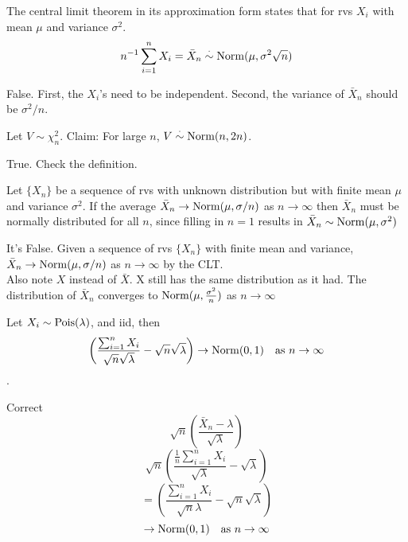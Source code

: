 \documentclass[tf-tutorial-all.tex]{subfiles}
\begin{document}
\begin{truefalse}
  The central limit theorem in its approximation form states that for
  rvs $X_i$ with mean $\mu$ and variance $\sigma^2$.
  $$ n^{-1}\sum_{i=1}^n X_i = \bar X_n \stackrel{\cdot}\sim \mathrm{Norm}(\mu, \sigma^2 \sqrt{n}) $$
\begin{solution}
False. First, the $X_i$'s need to be independent. Second, the variance of $\bar X_{n}$ should  be $\sigma^2/n$.
\end{solution}
\end{truefalse}

\begin{truefalse}
  Let $V \sim \chi^2_n$. Claim: For large $n$, $V \stackrel{\cdot}\sim \mathrm{Norm}(n, 2n)$.
\begin{solution}
True. Check the definition.
\end{solution}
\end{truefalse}

\begin{truefalse}
Let $\{X_{n}\}$ be a sequence of rvs with unknown distribution but with finite mean $\mu $ and variance $\sigma^{2}$.
If the average $\bar{X}_{n} \to \mathrm{Norm}(\mu, \sigma/n)$ as $n \to \infty$ then $\bar X_{n}$ must be normally distributed for all $n$, since filling in $ n=1 $ results in $\bar{X}_{n} \sim \mathrm{Norm}(\mu, \sigma^{2})$
\begin{solution}
It's False. Given a sequence of rvs $\{X_{n}\}$ with finite mean and variance,  $\bar{X}_{n} \to \mathrm{Norm}(\mu, \sigma/n)$ as $n \to \infty$ by the CLT.
\\Also note $X $ instead of $\bar{X}$. X still has the same distribution as it had. The distribution of $\bar{X}_{n}$ converges to $\mathrm{Norm}(\mu, \frac{\sigma^{2}}{n}) $ as $n \to \infty$
\end{solution}
\end{truefalse}


\begin{truefalse}
Let $X_{i} \sim \mathrm{Pois}(\lambda)$, and iid, then $$\left( \frac{ \sum^{n}_{i=1} X_{i}}{\sqrt{n} \sqrt{\lambda}} - \sqrt{n}\sqrt{\lambda} \right) \to \mathrm{Norm}(0,1) \quad \text{as } n \to \infty$$.
\begin{solution}
Correct\\
$$\sqrt{n} \left( \frac{ \bar{X}_{n}  - \lambda}{\sqrt{\lambda}}  \right) $$
$$\sqrt{n} \left( \frac{ \frac{1}{n} \sum^{n}_{i=1} X_{i}  }{\sqrt{\lambda}} - \sqrt{\lambda}  \right) $$
$$ = \left( \frac{ \sum^{n}_{i=1} X_{i}}{\sqrt{n}\lambda} - \sqrt{n}\sqrt{\lambda} \right)$$
$$
\to \mathrm{Norm}(0,1) \quad \text{as } n \to \infty$$
\end{solution}
\end{truefalse}
\end{document}
